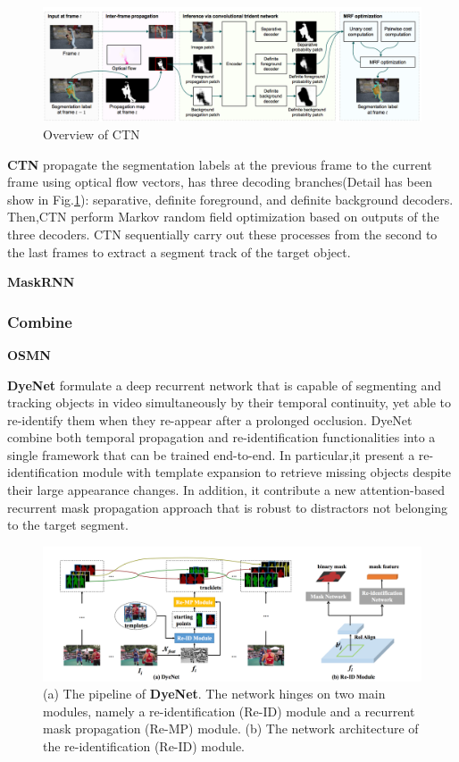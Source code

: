 \begin{figure}[ht]
    \centering
    \includegraphics[width=\textwidth]{./figure/CTN.png}
    \caption{Overview of CTN}
    \label{CTN}
\end{figure}

\textbf{CTN}\cite{CTN} propagate the segmentation labels at the previous frame to the current frame using optical ﬂow vectors, has three decoding branches(Detail has been show in Fig.\ref{CTN}): separative, definite foreground, and definite background decoders. Then,CTN perform Markov random field optimization based on outputs of the three decoders. CTN sequentially carry out these processes from the second to the last frames to extract a segment track of the target object. 

\textbf{MaskRNN}\cite{MaskRNN}


\subsubsection{Combine}

\textbf{OSMN}\cite{OSMN}

\textbf{DyeNet}\cite{DyeNet} formulate a deep recurrent network that is capable of segmenting and tracking objects in video simultaneously by their temporal continuity, yet able to re-identify them when they re-appear after a prolonged occlusion. DyeNet combine both temporal propagation and re-identification functionalities into a single framework that can be trained end-to-end. In particular,it present a re-identification module with template expansion to retrieve missing objects despite their large appearance changes. In addition, it contribute a new attention-based recurrent mask propagation approach that is robust to distractors not belonging to the target segment.

\begin{figure}[ht]
    \centering
    \includegraphics[width=\textwidth]{./figure/DyeNet.png}
    \caption{(a) The pipeline of \textbf{DyeNet}. The network hinges on two main modules, namely a re-identification (Re-ID) module and a recurrent mask propagation (Re-MP) module. (b) The network architecture of the re-identification (Re-ID) module.}
    \label{DyeNet}
\end{figure}

